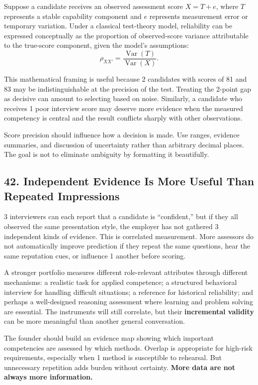 Suppose a candidate receives an observed assessment score $X = T + e$, where $T$ represents a stable capability component and $e$ represents measurement error or temporary variation. Under a classical test-theory model, reliability can be expressed conceptually as the proportion of observed-score variance attributable to the true-score component, given the model's assumptions:
\begin{equation}
\rho_{XX'} = \frac{\operatorname{Var}(T)}{\operatorname{Var}(X)}.
\end{equation}

This mathematical framing is useful because 2 candidates with scores of 81 and 83 may be indistinguishable at the precision of the test. Treating the 2-point gap as decisive can amount to selecting based on noise. Similarly, a candidate who receives 1 poor interview score may deserve more evidence when the measured competency is central and the result conflicts sharply with other observations.

Score precision should influence how a decision is made. Use ranges, evidence summaries, and discussion of uncertainty rather than arbitrary decimal places. The goal is not to eliminate ambiguity by formatting it beautifully.

\subsection*{42. Independent Evidence Is More Useful Than Repeated Impressions}

3 interviewers can each report that a candidate is ``confident,'' but if they all observed the same presentation style, the employer has not gathered 3 independent kinds of evidence. This is correlated measurement. More assessors do not automatically improve prediction if they repeat the same questions, hear the same reputation cues, or influence 1 another before scoring.

A stronger portfolio measures different role-relevant attributes through different mechanisms: a realistic task for applied competence; a structured behavioral interview for handling difficult situations; a reference for historical reliability; and perhaps a well-designed reasoning assessment where learning and problem solving are essential. The instruments will still correlate, but their \textbf{incremental validity} can be more meaningful than another general conversation.

The founder should build an evidence map showing which important competencies are assessed by which methods. Overlap is appropriate for high-risk requirements, especially when 1 method is susceptible to rehearsal. But unnecessary repetition adds burden without certainty. \textbf{More data are not always more information.}
